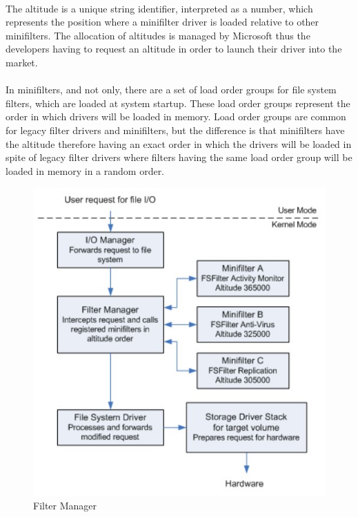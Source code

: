 		\paragraph{}
		The altitude is a unique string identifier, interpreted as a number, which represents the position where a minifilter driver is loaded relative to other minifilters. The allocation of altitudes is managed by Microsoft thus the developers having to request an altitude in order to launch their driver into the market. \cite{MSDNFltMgrConcepts}
		
		\paragraph{}
		In minifilters, and not only, there are a set of load order groups for file system filters, which are loaded at system startup. These load order groups represent the order in which drivers will be loaded in memory. \cite{MSDNFltMgrConcepts} Load order groups are common for legacy filter drivers and minifilters, but the difference is that minifilters have the altitude therefore having an exact order in which the drivers will be loaded in spite of legacy filter drivers where filters having the same load order group will be loaded in memory in a random order.
		
		\begin{figure}[h!]
			\begin{center}
				\includegraphics{images/FilterManager.jpg}
				\caption{Filter Manager \cite{MSDNFltMgrConcepts}}
				\label{fig:filterManager}
			\end{center}
		\end{figure}
		
